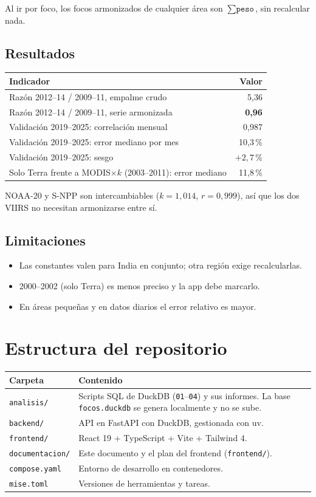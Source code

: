 \documentclass[11pt,a4paper]{article}
\begin{document}
Al ir por foco, los focos armonizados de cualquier área son $\sum \texttt{peso}$, sin recalcular nada.

\subsection*{Resultados}

\begin{tabularx}{\linewidth}{@{}Xr@{}}
\toprule
Indicador & Valor \\
\midrule
Razón 2012--14 / 2009--11, empalme crudo & 5{,}36 \\
Razón 2012--14 / 2009--11, serie armonizada & \textbf{0{,}96} \\
Validación 2019--2025: correlación mensual & 0{,}987 \\
Validación 2019--2025: error mediano por mes & 10{,}3\,\% \\
Validación 2019--2025: sesgo & $+2{,}7$\,\% \\
Solo Terra frente a MODIS$\times k$ (2003--2011): error mediano & 11{,}8\,\% \\
\bottomrule
\end{tabularx}

NOAA-20 y S-NPP son intercambiables ($k = 1{,}014$, $r = 0{,}999$), así que los dos VIIRS no
necesitan armonizarse entre sí.

\subsection*{Limitaciones}
\begin{itemize}
  \item Las constantes valen para India en conjunto; otra región exige recalcularlas.
  \item 2000--2002 (solo Terra) es menos preciso y la app debe marcarlo.
  \item En áreas pequeñas y en datos diarios el error relativo es mayor.
\end{itemize}

\section{Estructura del repositorio}

\begin{tabularx}{\linewidth}{@{}lX@{}}
\toprule
Carpeta & Contenido \\
\midrule
\texttt{analisis/} & Scripts SQL de DuckDB (\texttt{01}--\texttt{04}) y sus informes. La base
  \texttt{focos.duckdb} se genera localmente y no se sube. \\
\texttt{backend/} & API en FastAPI con DuckDB, gestionada con uv. \\
\texttt{frontend/} & React 19 + TypeScript + Vite + Tailwind 4. \\
\texttt{documentacion/} & Este documento y el plan del frontend (\texttt{frontend/}). \\
\texttt{compose.yaml} & Entorno de desarrollo en contenedores. \\
\texttt{mise.toml} & Versiones de herramientas y tareas. \\
\bottomrule
\end{tabularx}
\end{document}
